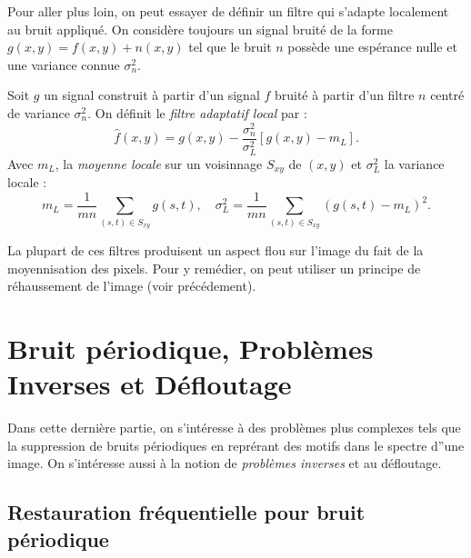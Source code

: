 Pour aller plus loin, on peut essayer de définir un filtre qui s'adapte localement au bruit appliqué. On considère toujours un signal bruité de la forme $ g(x,y) = f(x,y) + n(x,y)$ tel que le bruit $n$ possède une espérance nulle et une variance connue $ \sigma^2_n$. 

\begin{definition}
    Soit $g$ un signal construit à partir d'un signal $f$ bruité à partir d'un filtre $n$ centré de variance $ \sigma^2_n$. On définit le \emph{filtre adaptatif local} par : 
    \begin{equation}
        \hat{f}(x,y) = g(x,y) - \frac{\sigma_n^2}{\sigma_L^2} \left[ g(x,y) - m_L \right]. 
    \end{equation}
    Avec $m_L$, la \emph{moyenne locale} sur un voisinnage $S_{xy}$ de $(x,y)$ et $ \sigma_L^2$ la variance locale : 
    \begin{equation}
        m_L = \frac{1}{mn} \sum_{(s,t) \in S_{xy}} g(s,t), 
        \quad \sigma_L^2 = \frac{1}{mn} \sum_{(s,t) \in S_{xy}} (g(s,t) - m_L)^2. 
    \end{equation}
\end{definition}

\begin{remark}
    La plupart de ces filtres produisent un aspect flou sur l'image du fait de la moyennisation des pixels. Pour y remédier, on peut utiliser un principe de réhaussement de l'image (voir précédement). 
\end{remark}


\section{Bruit périodique, Problèmes Inverses et Défloutage}

Dans cette dernière partie, on s'intéresse à des problèmes plus complexes tels que la suppression de bruits périodiques en reprérant des motifs dans le spectre d''une image. On s'intéresse aussi à la notion de \emph{problèmes inverses} et au défloutage. 

\subsection{Restauration fréquentielle pour bruit périodique}

